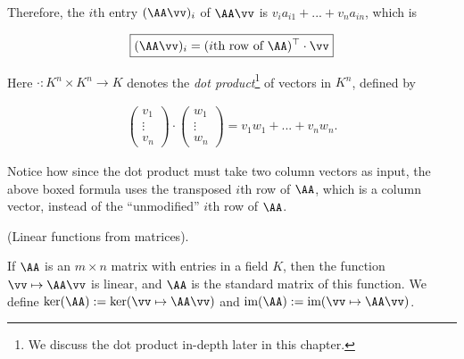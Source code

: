 \begin{theorem}
    Therefore, the $i$th entry $(\AA \vv)_i$ of $\AA \vv$ is $v_i a_{i1} + ... + v_n a_{in} $, which is
    
    \begin{align*}
        \boxed
        {
            (\AA \vv)_i = (\text{$i$th row of $\AA$})^\top \cdot \vv
        }
    \end{align*}

    
    Here $\cdot:K^n \times K^n \rightarrow K$ denotes the \textit{dot product}\footnote{We discuss the dot product in-depth later in this chapter.} of vectors in $K^n$, defined by
    
    \begin{align*}
        \begin{pmatrix} v_1 \\ \vdots \\ v_n \end{pmatrix}
        \cdot
        \begin{pmatrix} w_1 \\ \vdots \\ w_n \end{pmatrix}
        =
        v_1 w_1 + ... + v_n w_n.
    \end{align*}

    Notice how since the dot product must take two column vectors as input, the above boxed formula uses the transposed $i$th row of $\AA$, which is a column vector, instead of the ``unmodified'' $i$th row of $\AA$.
\end{theorem}

\begin{theorem}
    (Linear functions from matrices).
    
    If $\AA$ is an $m \times n$ matrix with entries in a field $K$, then the function $\vv \mapsto \AA \vv$ is linear, and $\AA$ is the standard matrix of this function. We define $\ker(\AA) := \ker(\vv \mapsto \AA \vv)$ and $\im(\AA) := \im(\vv \mapsto \AA \vv)$.
\end{theorem}

